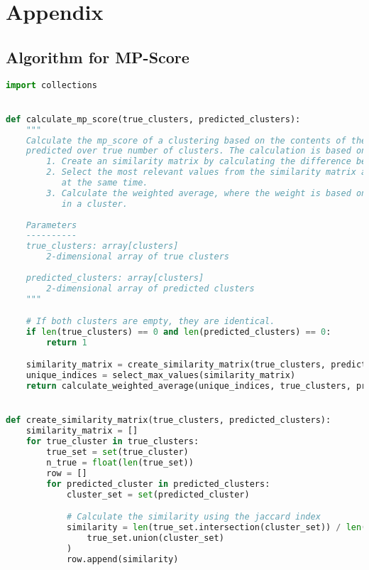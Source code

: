 \section{Appendix}

\subsection{Algorithm for MP-Score}

\begin{lstlisting}[language=Python, caption=Calculate the MP-Score between two clusterings., label={lst:select_max_values}]
import collections


def calculate_mp_score(true_clusters, predicted_clusters):
    """
    Calculate the mp_score of a clustering based on the contents of the clusters and the overall difference in
    predicted over true number of clusters. The calculation is based on three steps:
        1. Create an similarity matrix by calculating the difference between each cluster of both clusterings.
        2. Select the most relevant values from the similarity matrix and make sure no two clusters are being used 
           at the same time.
        3. Calculate the weighted average, where the weight is based on the true and predicted amount of elements 
           in a cluster.
    
    Parameters
    ----------
    true_clusters: array[clusters]
        2-dimensional array of true clusters
    
    predicted_clusters: array[clusters] 
        2-dimensional array of predicted clusters
    """

    # If both clusters are empty, they are identical.
    if len(true_clusters) == 0 and len(predicted_clusters) == 0:
        return 1

    similarity_matrix = create_similarity_matrix(true_clusters, predicted_clusters)
    unique_indices = select_max_values(similarity_matrix)
    return calculate_weighted_average(unique_indices, true_clusters, predicted_clusters)


def create_similarity_matrix(true_clusters, predicted_clusters):
    similarity_matrix = []
    for true_cluster in true_clusters:
        true_set = set(true_cluster)
        n_true = float(len(true_set))
        row = []
        for predicted_cluster in predicted_clusters:
            cluster_set = set(predicted_cluster)

            # Calculate the similarity using the jaccard index
            similarity = len(true_set.intersection(cluster_set)) / len(
                true_set.union(cluster_set)
            )
            row.append(similarity)


\end{lstlisting}
